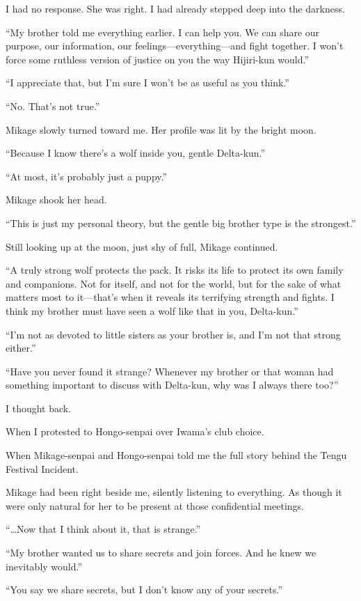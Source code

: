 \documentclass[
    a4paper,
    12pt,
    twoside,
    openany,
    UTF8,
    fontset=windows
]{ctexbook}
\begin{document}
I had no response. She was right. I had already stepped deep into the darkness.

``My brother told me everything earlier. I can help you. We can share our purpose, our information, our feelings---everything---and fight together. I won't force some ruthless version of justice on you the way Hijiri-kun would.''

``I appreciate that, but I'm sure I won't be as useful as you think.''

``No. That's not true.''

Mikage slowly turned toward me. Her profile was lit by the bright moon.

``Because I know there's a wolf inside you, gentle Delta-kun.''

``At most, it's probably just a puppy.''

Mikage shook her head.

``This is just my personal theory, but the gentle big brother type is the strongest.''

Still looking up at the moon, just shy of full, Mikage continued.

``A truly strong wolf protects the pack. It risks its life to protect its own family and companions. Not for itself, and not for the world, but for the sake of what matters most to it---that's when it reveals its terrifying strength and fights. I think my brother must have seen a wolf like that in you, Delta-kun.''

``I'm not as devoted to little sisters as your brother is, and I'm not that strong either.''

``Have you never found it strange? Whenever my brother or that woman had something important to discuss with Delta-kun, why was I always there too?''

I thought back.

When I protested to Hongo-senpai over Iwama's club choice.

When Mikage-senpai and Hongo-senpai told me the full story behind the Tengu Festival Incident.

Mikage had been right beside me, silently listening to everything. As though it were only natural for her to be present at those confidential meetings.

``\dots Now that I think about it, that is strange.''

``My brother wanted us to share secrets and join forces. And he knew we inevitably would.''

``You say we share secrets, but I don't know any of your secrets.''
\end{document}
